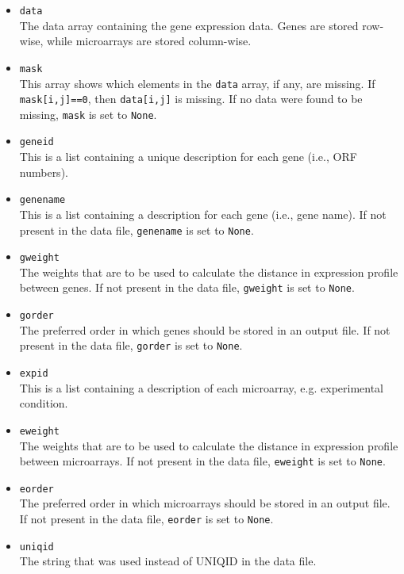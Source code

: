 \documentclass{report}
\begin{document}
\begin{itemize}
\item \verb|data| \\
The data array containing the gene expression data. Genes are stored row-wise, while microarrays are stored column-wise.

\item \verb|mask| \\
This array shows which elements in the \verb|data| array, if any, are missing. If \verb|mask[i,j]==0|, then \verb|data[i,j]| is missing. If no data were found to be missing, \verb|mask| is set to \verb|None|.

\item \verb|geneid| \\
This is a list containing a unique description for each gene (i.e., ORF numbers).

\item \verb|genename| \\
This is a list containing a description for each gene (i.e., gene name). If not present in the data file, \verb|genename| is set to \verb|None|.

\item \verb|gweight| \\
The weights that are to be used to calculate the distance in expression profile between genes. If not present in the data file, \verb|gweight| is set to \verb|None|.

\item \verb|gorder| \\
The preferred order in which genes should be stored in an output file. If not present in the data file, \verb|gorder| is set to \verb|None|.

\item \verb|expid| \\
This is a list containing a description of each microarray, e.g. experimental condition.

\item \verb|eweight| \\
The weights that are to be used to calculate the distance in expression profile between microarrays. If not present in the data file, \verb|eweight| is set to \verb|None|.

\item \verb|eorder| \\
The preferred order in which microarrays should be stored in an output file. If not present in the data file, \verb|eorder| is set to \verb|None|.

\item \verb|uniqid| \\
The string that was used instead of UNIQID in the data file.
\end{itemize}
\end{document}

